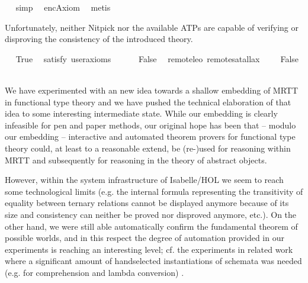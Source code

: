 \begin{isabellebody}
\isadelimproof
\ %
\endisadelimproof
%
\isatagproof
{}\isamarkupfalse%
\ simp\ \isamarkupfalse%
\ encAxiom{}\ \isamarkupfalse%
\ metis%
\endisatagproof
{\isafoldproof}%
%
\isadelimproof
%
\endisadelimproof
%
\isamarkuptrue%
%
\begin{isamarkuptext}%
Unfortunately, neither Nitpick nor the available
  ATPs are capable of verifying or disproving the consistency of the introduced theory.%
\end{isamarkuptext}\isamarkuptrue%
\ \isamarkupfalse%
\ True\ \isamarkupfalse%
\ {\isacharbrackleft}satisfy{\isacharcomma}\ user{\isacharunderscore}axioms{\isacharbrackright}%
\isadelimproof
\ %
\endisadelimproof
%
\isatagproof
{}\isamarkupfalse%
%
\endisatagproof
{\isafoldproof}%
%
\isadelimproof
%
\endisadelimproof
\ \isanewline
\ \isamarkupfalse%
\ False\ \isamarkupfalse%
\ {\isacharbrackleft}remote{\isacharunderscore}leo{}\ remote{\isacharunderscore}satallax{\isacharbrackright}%
\isadelimproof
\ %
\endisadelimproof
%
\isatagproof
{}\isamarkupfalse%
%
\endisatagproof
{\isafoldproof}%
%
\isadelimproof
%
\endisadelimproof
\isanewline
\ \isamarkupfalse%
\ False\ \isamarkupfalse%
%
\isadelimproof
\ %
\endisadelimproof
%
\isatagproof
{}\isamarkupfalse%
%
\endisatagproof
{\isafoldproof}%
%
\isadelimproof
%
\endisadelimproof
%
\isamarkuptrue%
%
\begin{isamarkuptext}%
We have experimented with an new idea towards a shallow embedding of MRTT in 
  functional type theory 
  and we have pushed the technical 
  elaboration of that idea to some interesting intermediate state.   
  While our embedding is clearly infeasible for pen and paper methods, 
  our original hope has been that -- modulo our embedding -- interactive and automated theorem provers for 
  functional type theory could, at least to a reasonable extend, be (re-)used for reasoning within
  MRTT and subsequently for reasoning in the theory of abstract objects. 


  However, within the system infrastructure of Isabelle/HOL we seem to reach some technological limits (e.g. the 
internal formula representing the transitivity of equality between ternary relations cannot be displayed anymore 
 because of its size and consistency can neither be proved nor disproved anymore, etc.).
 On the other hand, we were still able automatically confirm the 
 fundamental theorem of possible worlds, and in this respect the degree of automation provided in our
 experiments is reaching an interesting level; cf. the experiments in related work where 
 a significant amount of handselected instantiations of schemata was needed (e.g. for comprehension and lambda
 conversion) \cite{FitelsonZ07,Zalta15}.


\end{isamarkuptext}
\end{isabellebody}
